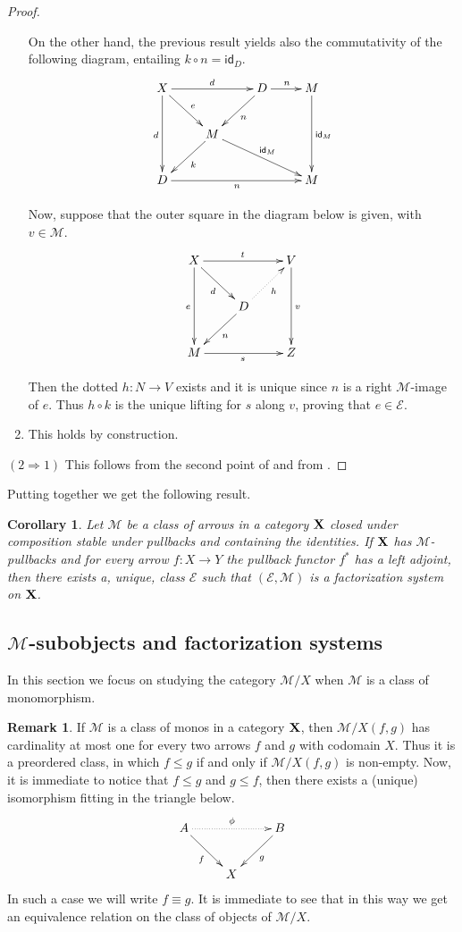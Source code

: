 \documentclass[a4paper]{article}
\newcommand{\id}[1]{\mathsf{id}_{#1}}
\def\D{\textbf {\textup{D}}}
\def\X{\textbf {\textup{X}}}
\newtheorem{corollary}[theorem]{Corollary}
\theoremstyle{definition}
\newtheorem{remark}[theorem]{Remark}
\begin{document}
\begin{proof}
\begin{enumerate}
		On the other hand, the previous result yields also the commutativity of the following diagram, entailing $k\circ n=\id{D}$.
		\[\xymatrix{X \ar[rr]^{d} \ar[dr]^{e}\ar[dd]_{d}& &D \ar[r]^{n}\ar[dl]^{n}& M \ar[dd]^{\id{M}}\\ & M\ar[dl]^{k} \ar[drr]^{\id{M}}\\D\ar[rrr]_{n}&&&M}\]
		
		Now, suppose that the outer square in the diagram below is given, with $v\in \mathcal{M}$.
		\[\xymatrix{X \ar[dd]_{e} \ar[dr]_{d}\ar[rr]^{t}&& V \ar[dd]^{v}\\ & D \ar[dl]^{n} \ar@{.>}[ur]_{h}\\M \ar[rr]_{s}&& Z}\]
		
		Then the dotted $h\colon N\to V$ exists and it is unique since $n$ is a right $\mathcal{M}$-image of  $e$. Thus $h\circ k$ is the unique lifting for $s$ along $v$, proving that $e\in \mathcal{E}$.
		\item This holds by construction.
	\end{enumerate}
	
	\smallskip \noindent $(2\Rightarrow 1)$  This follows from the second point of  and from . \qedhere  
\end{proof}

Putting together  we get the following result.

\begin{corollary}\label{cor:fact}
	Let $\mathcal{M}$ be a class of arrows in a category $\X$ closed under composition stable under pullbacks and containing the identities. If $\X$ has $\mathcal{M}$-pullbacks and for every arrow $f\colon X\to Y$ the pullback functor $f^*$ has a left adjoint, then there exists a, unique, class $\mathcal{E}$ such that $(\mathcal{E}, \mathcal{M})$ is a factorization system on $\X$.
\end{corollary}

\subsection{$\mathcal{M}$-subobjects and factorization systems}

In this section we focus on studying the category $\mathcal{M}/X$ when $\mathcal{M}$ is a class of monomorphism.

\begin{remark}
	If  $\mathcal{M}$ is a class of monos in a category $\X$, then $\mathcal{M}/X(f,g)$ has cardinality at most one for every two arrows $f$ and $g$ with codomain $X$. Thus it is a preordered class, in which $f\leq g$ if and only if  $\mathcal{M}/X(f,g)$ is non-empty. Now, it is immediate to notice that $f\leq g$ and $g\leq f$, then there exists a (unique) isomorphism fitting in the triangle below.
	\[\xymatrix{A\ar@{.>}[rr]^{\phi} \ar[dr]_{f} && B \ar[dl]^{g}\\ & X}\]
	In such a case we will write $f\equiv g$. It is immediate to see that in this way we get an equivalence relation on the class of objects of $\mathcal{M}/X$.
\end{remark}
\end{document}
